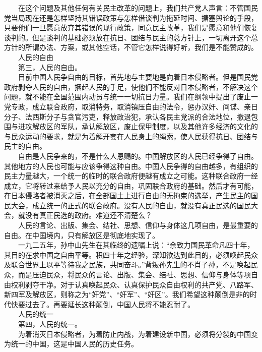 \documentclass[cn,11pt,chinese]{elegantbook}
\begin{document}
　　在这个问题及其他任何有关民主改革的问题上，我们共产党人声言：不管国民党当局现在还是怎样坚持其错误政策与怎样借谈判为拖延时间、搪塞舆论的手段，只要他们一旦愿意放弃其错误的现行政策，同意民主改革，我们是愿意和他们恢复谈判的。但是谈判的基础必须放在抗日、团结与民主的总方针上，一切离开这个总方针的所谓办法、方案，或其他空话，不管它怎样说得好听，我们是不能赞成的。\\
　　人民的自由\\
　　第三，人民的自由。\\
　　目前中国人民争自由的目标，首先地与主要地是向着日本侵略者。但是国民党政府剥夺人民的自由，捆起人民的手足，使他们不能反对日本侵略者，不解决这个问题，就不能在全国范围内动员与统一一切抗日力量。我们在纲领中提出了废止一党专政，成立联合政府，取消特务，取消镇压自由的法令，惩办汉奸、间谍、亲日分子、法西斯分子与贪官污吏，释放政治犯，承认各民主党派的合法地位，撤退包围与进攻解放区的军队，承认解放区，废止保甲制度，以及其他许多经济的文化的与民众运动的要求，就是为着解开套在人民身上的绳索，使人民获得抗日、团结与民主的自由。\\
　　自由是人民争来的，不是什么人恩赐的。中国解放区的人民已经争得了自由。其他地方的人民也可能与应该争得这种自由。中国人民争得的自由越多，有组织的民主力量越大，一个统一的临时的联合政府便越有成立之可能。这种联合政府一经成立，它将转过来给予人民以充分的自由，巩固联合政府的基础。然后才有可能，在日本侵略者被消灭之后，在全部国土上进行自由的无拘束的选举，产生民主的国民大会，成立统一的正式的联合政府。没有人民的自由，就没有真正民选的国民大会，就没有真正民选的政府。难道还不清楚么？\\
　　人民的言论、出版、集会、结社、思想、信仰与身体这几项自由，是最重要的自由。在中国境内，只有解放区是彻底地实现了。\\
　　一九二五年，孙中山先生在其临终的遗嘱上说：“余致力国民革命凡四十年，其目的在求中国之自由平等。积四十年之经验，深知欲达到此目的，必须唤起民众及联合世界上以平等待我之民族，共同奋斗。”背叛孙先生的不肖子孙，不是唤起民众，而是压迫民众，将民众的言论、出版、集会、结社、思想、信仰与身体等项自由权利剥夺干净。对于认真唤起民众、认真保护民众自由权利的共产党、八路军、新四军及解放区，则称之为“奸党”、“奸军”、“奸区”。我们希望这种颠倒是非的时代快要过去了。再要延长这种颠倒，中国人民将不能忍耐了。\\
　　人民的统一\\
　　第四，人民的统一。\\
　　为着消灭日本侵略者，为着防止内战，为着建设新中国，必须将分裂的中国变为统一的中国，这是中国人民的历史任务。\\
\end{document}

